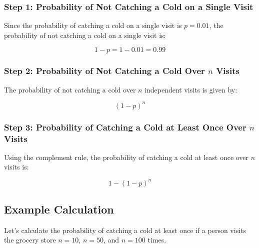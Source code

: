 \documentclass[
]{article}
\begin{document}
\hypertarget{step-1-probability-of-not-catching-a-cold-on-a-single-visit}{%
\subsubsection{Step 1: Probability of Not Catching a Cold on a Single
Visit}\label{step-1-probability-of-not-catching-a-cold-on-a-single-visit}}

Since the probability of catching a cold on a single visit is
\(p = 0.01\), the probability of not catching a cold on a single visit
is:

\[
1 - p = 1 - 0.01 = 0.99
\]

\hypertarget{step-2-probability-of-not-catching-a-cold-over-n-visits}{%
\subsubsection{\texorpdfstring{Step 2: Probability of Not Catching a
Cold Over \(n\)
Visits}{Step 2: Probability of Not Catching a Cold Over n Visits}}\label{step-2-probability-of-not-catching-a-cold-over-n-visits}}

The probability of not catching a cold over \(n\) independent visits is
given by:

\[
(1 - p)^n
\]

\hypertarget{step-3-probability-of-catching-a-cold-at-least-once-over-n-visits}{%
\subsubsection{\texorpdfstring{Step 3: Probability of Catching a Cold at
Least Once Over \(n\)
Visits}{Step 3: Probability of Catching a Cold at Least Once Over n Visits}}\label{step-3-probability-of-catching-a-cold-at-least-once-over-n-visits}}

Using the complement rule, the probability of catching a cold at least
once over \(n\) visits is:

\[
1 - (1 - p)^n
\]

\hypertarget{example-calculation}{%
\subsection{Example Calculation}\label{example-calculation}}

Let's calculate the probability of catching a cold at least once if a
person visits the grocery store \(n = 10\), \(n = 50\), and \(n = 100\)
times.
\end{document}
